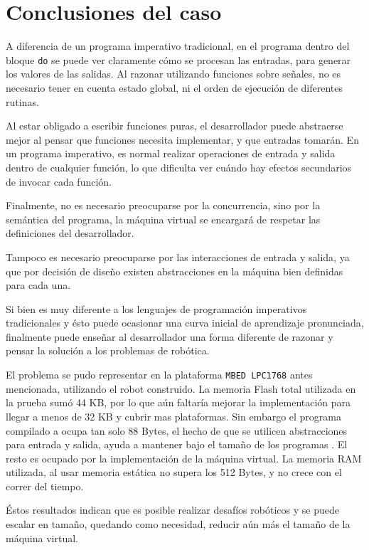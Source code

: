 




\section {Conclusiones del caso}

  A diferencia de un programa imperativo tradicional, en el programa
\frob{} dentro del bloque \texttt{do} se puede ver claramente cómo
se procesan las entradas, para generar los valores de las salidas.
  Al razonar utilizando funciones sobre señales, no es necesario
tener en cuenta estado global, ni el orden de ejecución de
diferentes rutinas.

  Al estar obligado a escribir funciones puras, el desarrollador
puede abstraerse mejor al pensar que funciones necesita implementar,
y que entradas tomarán. En un programa imperativo, es normal realizar
operaciones de entrada y salida dentro de cualquier función, lo que
dificulta ver cuándo hay efectos secundarios de invocar cada función.

  Finalmente, no es necesario preocuparse por la concurrencia, sino
por la semántica del programa, la máquina virtual se encargará de
respetar las definiciones del desarrollador.

  Tampoco es necesario preocuparse por las interacciones de entrada
y salida, ya que por decisión de diseño existen abstracciones en
la máquina bien definidas para cada una.

  Si bien \frob{} es muy diferente a los lenguajes de
programación imperativos tradicionales y ésto puede ocasionar una
curva inicial de aprendizaje pronunciada, finalmente puede enseñar al
desarrollador una forma diferente de razonar y pensar la solución
a los problemas de robótica.

  El problema se pudo representar en la plataforma \texttt{MBED LPC1768} antes
mencionada, utilizando el robot construido.
  La memoria Flash total utilizada en la prueba sumó 44 KB, por lo que
aún faltaría mejorar la implementación para llegar a menos de 32 KB y
cubrir mas plataformas.
  Sin embargo el programa \willie{} compilado a \alf{} ocupa tan solo 88 Bytes,
el hecho de que se utilicen abstracciones para entrada y salida, ayuda a mantener
bajo el tamaño de los programas \alf{}. El resto es ocupado por la implementación de
la máquina virtual.
  La memoria RAM utilizada, al usar memoria estática no supera los 512 Bytes, y no
crece con el correr del tiempo.

  Éstos resultados indican que es posible realizar desafíos robóticos y se puede
escalar en tamaño, quedando como necesidad, reducir aún más el tamaño de la
máquina virtual.
